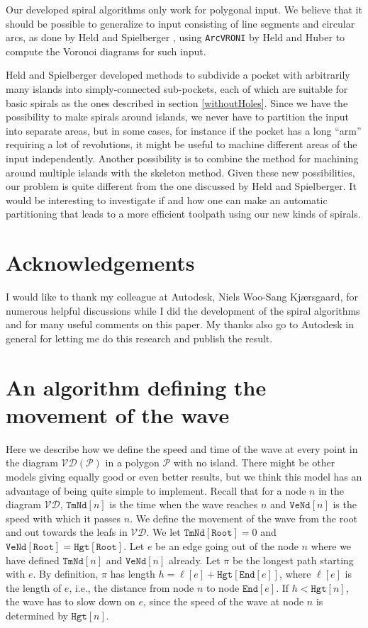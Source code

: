 \documentclass[3p]{elsarticle}
\newcommand{\VD}{\mathcal{VD}}
\newcommand{\PP}{\mathcal{P}}
\newcommand{\nodeEnd}{\texttt{End}}
\newcommand{\ttimeO}{\texttt{TmNd}}
\newcommand{\speedO}{\texttt{VeNd}}
\newcommand{\height}{\texttt{Hgt}}
\newcommand{\rootNode}{\texttt{Root}}
\begin{document}
Our developed spiral algorithms only work for polygonal input. We believe that it should be possible to
generalize to input consisting of line segments and circular arcs, as done by
Held and Spielberger \cite{held2009}, using \texttt{ArcVRONI} by Held and Huber \cite{held2009topology}
to compute the Voronoi diagrams for such input.

Held and Spielberger \cite{held2014} developed methods to subdivide a pocket with arbitrarily many
islands into simply-connected sub-pockets, each of which are suitable for basic spirals as the ones
described in section \ref{withoutHoles}. Since we have the possibility to make spirals around islands,
we never have to partition the input into separate areas, but in some cases, for instance if the
pocket has a long ``arm'' requiring a lot of revolutions, it might be useful to machine
different areas of the input independently. Another possibility is to combine the method for
machining around multiple islands with the skeleton method.
Given these new possibilities, our problem is quite different from the one
discussed by Held and Spielberger. It would be interesting to investigate if and how one can
make an automatic partitioning that leads to a more efficient toolpath using our new kinds of spirals.

\section*{Acknowledgements}

I would like to thank my colleague at Autodesk,
Niels Woo-Sang Kj\ae rsgaard, for numerous helpful discussions while I did
the development of the spiral algorithms and for many useful comments on this paper.
My thanks also go to Autodesk in general for letting me do this research and publish the
result.


{}


\newpage
\appendix
\section{An algorithm defining the movement of the wave}\label{appA}

Here we describe how we define the speed and time of the wave at every point in the diagram
$\VD(\PP)$ in a polygon $\PP$ with no island.
There might be other models giving equally good or even better
results, but we think this model has an advantage of being quite simple to implement.
Recall that for a node $n$ in the diagram $\VD$, $\ttimeO[n]$ is the time when the wave
reaches $n$ and $\speedO[n]$ is the speed with which it passes $n$.
We define the movement of the wave from the root and out towards the leafs in
$\VD$.
We let $\ttimeO[\rootNode]=0$ and $\speedO[\rootNode]=\height[\rootNode]$.
Let $e$ be an edge going out of the node $n$ where we have
defined $\ttimeO[n]$ and $\speedO[n]$ already. Let $\pi$ be
the longest path starting with $e$. By definition,
$\pi$ has length $h=\ell[e]+\height[\nodeEnd[e]]$, where $\ell[e]$ is the length of $e$, i.e.,
the distance from node $n$ to node $\nodeEnd[e]$.
If $h<\height[n]$, the wave has to slow down on $e$, since the speed of the wave at node $n$
is determined by $\height[n]$.
\end{document}
